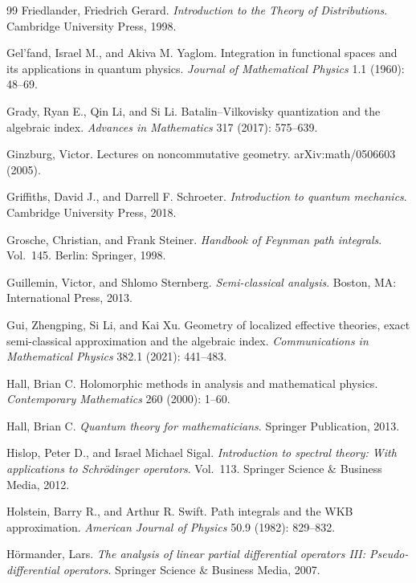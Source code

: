 \begin{thebibliography}{99}
Friedlander, Friedrich Gerard.
\emph{Introduction to the Theory of Distributions}. Cambridge University Press, 1998.

Gel'fand, Israel M., and Akiva M. Yaglom.
Integration in functional spaces and its applications in quantum physics.
\emph{Journal of Mathematical Physics} 1.1 (1960): 48--69.

Grady, Ryan E., Qin Li, and Si Li.
Batalin--Vilkovisky quantization and the algebraic index.
\emph{Advances in Mathematics} 317 (2017): 575--639.

Ginzburg, Victor.
Lectures on noncommutative geometry.
arXiv:math/0506603 (2005).

Griffiths, David J., and Darrell F. Schroeter.
\emph{Introduction to quantum mechanics}. Cambridge University Press, 2018.

Grosche, Christian, and Frank Steiner.
\emph{Handbook of Feynman path integrals}. Vol.~145. Berlin: Springer, 1998.

Guillemin, Victor, and Shlomo Sternberg.
\emph{Semi-classical analysis}. Boston, MA: International Press, 2013.

Gui, Zhengping, Si Li, and Kai Xu.
Geometry of localized effective theories, exact semi-classical approximation and the
algebraic index.
\emph{Communications in Mathematical Physics} 382.1 (2021): 441--483.

Hall, Brian C.
Holomorphic methods in analysis and mathematical physics.
\emph{Contemporary Mathematics} 260 (2000): 1--60.

Hall, Brian C.
\emph{Quantum theory for mathematicians}. Springer Publication, 2013.

Hislop, Peter D., and Israel Michael Sigal.
\emph{Introduction to spectral theory: With applications to Schr\"odinger operators}.
Vol.~113. Springer Science \& Business Media, 2012.

Holstein, Barry R., and Arthur R. Swift.
Path integrals and the WKB approximation.
\emph{American Journal of Physics} 50.9 (1982): 829--832.

H\"ormander, Lars.
\emph{The analysis of linear partial differential operators III: Pseudo-differential
operators}. Springer Science \& Business Media, 2007.


\end{thebibliography}
